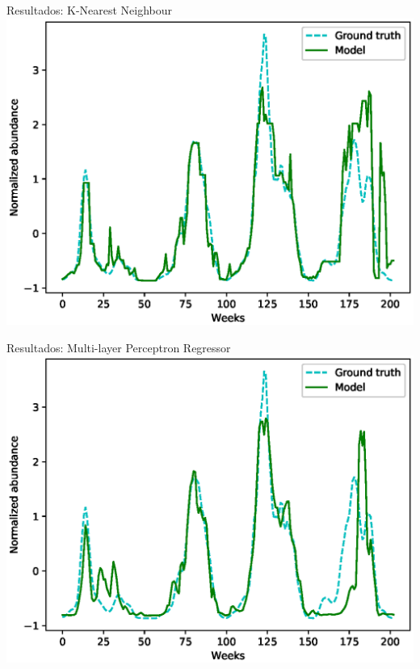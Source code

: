 \documentclass[10pt]{beamer}
\begin{document}
\begin{frame}{Resultados: K-Nearest Neighbour}
  \includegraphics[width=\textwidth]{knnr1.eps}
\end{frame}

\begin{frame}{Resultados: Multi-layer Perceptron Regressor}
  \includegraphics[width=\textwidth]{mlpr.eps}
\end{frame}
\end{document}
